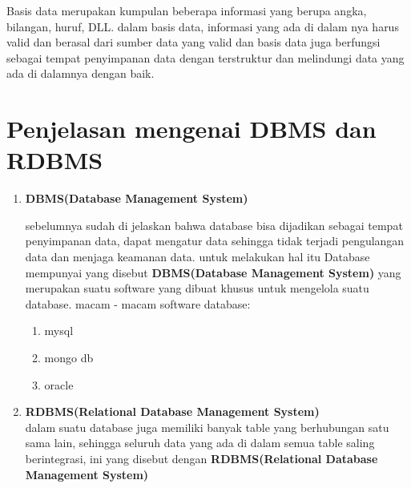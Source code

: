 \documentclass[a4paper,12pt]{article}
\begin{document}
         \par Basis data merupakan kumpulan beberapa informasi yang berupa angka, bilangan, huruf, DLL. dalam basis data, informasi yang ada di dalam nya harus valid dan berasal dari sumber data yang valid dan basis data juga berfungsi sebagai tempat penyimpanan data dengan terstruktur dan melindungi data yang ada di dalamnya dengan baik.
        \vspace{-0.5cm}
        \section{\textbf{Penjelasan mengenai DBMS dan RDBMS}}
        \begin{enumerate}
          \item \textbf{DBMS(Database Management System)}\\
          \vspace{-0.5cm}
          \par sebelumnya sudah di jelaskan bahwa database bisa dijadikan sebagai tempat penyimpanan data, dapat mengatur data sehingga tidak terjadi pengulangan data dan menjaga keamanan data. untuk melakukan hal itu Database mempunyai yang disebut \textbf{DBMS(Database Management System)} yang merupakan suatu software yang dibuat khusus untuk mengelola suatu database. macam - macam software database:\\
          \vspace{-0.5cm}
          \begin{enumerate}
            \item mysql
            \item mongo db
            \item oracle
          \end{enumerate}
          \newpage
          \item \textbf{RDBMS(Relational Database Management System)}\\
          \vspace{-0.7cm}
          \justify dalam suatu database juga memiliki banyak table yang berhubungan satu sama lain, sehingga seluruh data yang ada di dalam semua table saling berintegrasi, ini yang disebut dengan \textbf{RDBMS(Relational Database Management System)}
        \end{enumerate}
    
\end{document}
